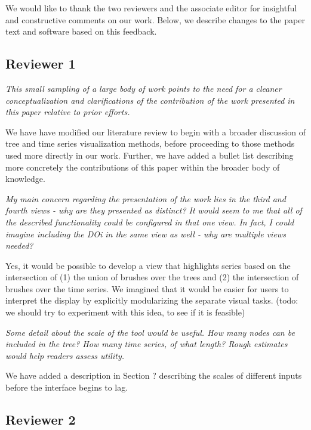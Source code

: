\documentclass{article}
\begin{document}
We would like to thank the two reviewers and the associate editor for insightful
and constructive comments on our work. Below, we describe changes to the paper
text and software based on this feedback.

\subsection{Reviewer 1}

\textit{This small sampling of a large body of work points to the need for a
  cleaner conceptualization and clarifications of the contribution of the work
  presented in this paper relative to prior efforts.}

We have have modified our literature review to begin with a broader discussion
of tree and time series visualization methods, before proceeding to those
methods used more directly in our work. Further, we have added a bullet list
describing more concretely the contributions of this paper within the broader
body of knowledge.

\textit{My main concern regarding the presentation of the work lies in the third
  and fourth views - why are they presented as distinct? It would seem to me
  that all of the described functionality could be configured in that one view.
  In fact, I could imagine including the DOi in the same view as well - why are
  multiple views needed?}

Yes, it would be possible to develop a view that highlights series based on the
intersection of (1) the union of brushes over the trees and (2) the intersection
of brushes over the time series. We imagined that it would be easier for users
to interpret the display by explicitly modularizing the separate visual tasks.
(todo: we should try to experiment with this idea, to see if it is feasible)

\textit{Some detail about the scale of the tool would be useful. How many nodes
  can be included in the tree? How many time series, of what length? Rough
  estimates would help readers assess utility.}

We have added a description in Section ? describing the scales of different
inputs before the interface begins to lag.

\subsection{Reviewer 2}
\end{document}
